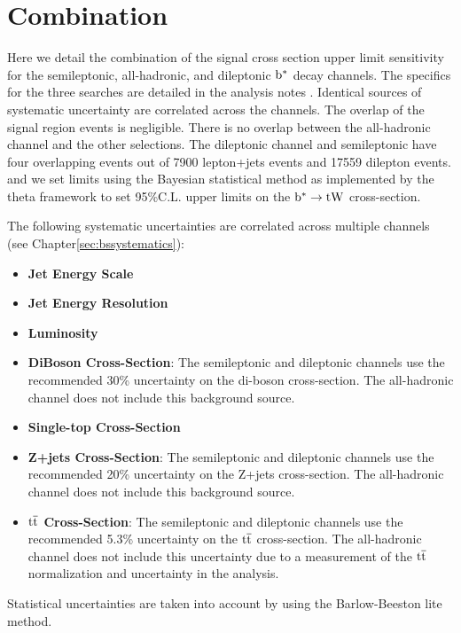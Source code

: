 \chapter{Combination}	
\label{sec:bsintro} 
Here we detail the combination of the signal cross section upper limit sensitivity for the semileptonic, all-hadronic, and dileptonic $\mathrm{b}^{*}$ decay channels.  
The specifics for the three searches are detailed in the analysis notes \cite{CMS-AN-14-049,CMS-AN-14-103,CMS-AN-13-415}.  Identical sources of systematic uncertainty are 
correlated across the channels.  The overlap of the signal region events is negligible.  There is no overlap between the all-hadronic channel and the other selections.  
The dileptonic channel and semileptonic have four overlapping events out of 7900 lepton+jets events and 17559 dilepton events.
and we set limits using the Bayesian statistical method as implemented by the theta 
framework to set 95\%C.L. upper limits on the $\mathrm{b}^{*} \to \mathrm{tW}$ cross-section.

The following systematic uncertainties are correlated across multiple channels (see Chapter\ref{sec:bssystematics}):
	
\begin{itemize}
\item \textbf{Jet Energy Scale}
\item \textbf{Jet Energy Resolution}
\item \textbf{Luminosity}
\item \textbf{DiBoson Cross-Section}:  The semileptonic and dileptonic channels use the recommended 30\% uncertainty on the di-boson cross-section.  The all-hadronic channel does not 
include this background source.
\item \textbf{Single-top Cross-Section}
\item \textbf{Z+jets Cross-Section}:  The semileptonic and dileptonic channels use the recommended 20\% uncertainty on the Z+jets cross-section.  The all-hadronic channel does not 
include this background source.
\item \textbf{$\mathrm{t\overline{t}}$ Cross-Section}:  The semileptonic and dileptonic channels use the recommended 5.3\% uncertainty on the $\mathrm{t\overline{t}}$ cross-section.  The all-hadronic channel does not 
include this uncertainty due to a measurement of the $\mathrm{t\overline{t}}$ normalization and uncertainty in the analysis.
\end{itemize}

Statistical uncertainties are taken into account by using the Barlow-Beeston lite method.

